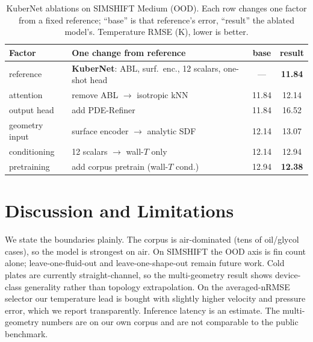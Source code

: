 \documentclass[conference]{IEEEtran}
\begin{document}
\begin{table}[t]\renewcommand{\arraystretch}{1.2}
\caption{KuberNet ablations on SIMSHIFT Medium (OOD). Each row changes one factor from a fixed reference; ``base'' is that reference's error, ``result'' the ablated model's. Temperature RMSE (K), lower is better.}
\label{tab:abl}\centering
\begin{tabular}{@{}l p{3.2cm} c c@{}}\toprule
Factor & One change from reference & base & result \\ \midrule
reference & \textbf{KuberNet}: ABL, surf.\ enc., 12 scalars, one-shot head & --- & \textbf{11.84} \\
attention & remove ABL $\to$ isotropic kNN & 11.84 & 12.14 \\
output head & add PDE-Refiner & 11.84 & 16.52 \\
geometry input & surface encoder $\to$ analytic SDF & 12.14 & 13.07 \\
conditioning & 12 scalars $\to$ wall-$T$ only & 12.14 & 12.94 \\
pretraining & add corpus pretrain (wall-$T$ cond.) & 12.94 & \textbf{12.38} \\ \bottomrule
\end{tabular}
\end{table}

\section{Discussion and Limitations}
We state the boundaries plainly. The corpus is air-dominated (tens of oil/glycol cases), so the model
is strongest on air. On SIMSHIFT the OOD axis is fin count alone; leave-one-fluid-out and
leave-one-shape-out remain future work. Cold plates are currently straight-channel, so the
multi-geometry result shows device-class generality rather than topology extrapolation. On the
averaged-nRMSE selector our temperature lead is bought with slightly higher velocity and pressure
error, which we report transparently. Inference latency is an estimate. The multi-geometry numbers are on our
own corpus and are not comparable to the public benchmark.
\end{document}
